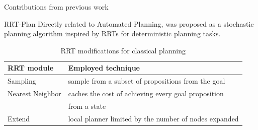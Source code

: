 \documentclass[10pt, xcolor=table]{beamer}
\begin{document}
\begin{frame}{Contributions from previous work}
\begin{exampleblock}{RRT-Plan\cite{burfoot2006rrt}}
Directly related to Automated Planning, was proposed as a stochastic planning algorithm inspired by RRTs for deterministic planning tasks.

\begin{table}[]
\centering
\caption{RRT modifications for classical planning}
\vspace{-0.5cm}
\begin{tabular}{|l|l|}
\hline
\rowcolor[HTML]{34696D} 
{\color[HTML]{000000} \textbf{RRT module}} & {\color[HTML]{000000} \textbf{Employed technique}}      \\ \hline
Sampling                                   & sample from a subset of propositions from the goal      \\ \hline
Nearest Neighbor                           & caches the cost of achieving every goal proposition     \\
                                           & from a state                                            \\ \hline
Extend                                     & local planner limited by the number of nodes expanded   \\ \hline
\end{tabular}
\end{table}
\end{exampleblock}
\end{frame}
\end{document}
